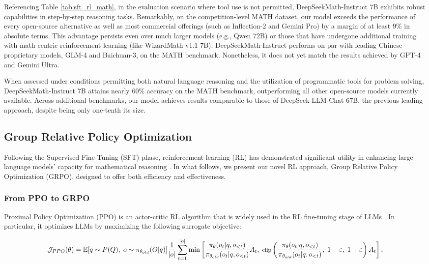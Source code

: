 \begin{itemize}[topsep=0pt]
\begin{itemize}[topsep=0pt]
Referencing Table \ref{tab:sft_rl_math}, in the evaluation scenario where tool use is not permitted, DeepSeekMath-Instruct 7B exhibits robust capabilities in step-by-step reasoning tasks. Remarkably, on the competition-level MATH dataset, our model exceeds the performance of every open-source alternative as well as most commercial offerings (such as Inflection-2 and Gemini Pro) by a margin of at least 9\% in absolute terms. This advantage persists even over much larger models (e.g., Qwen 72B) or those that have undergone additional training with math-centric reinforcement learning (like WizardMath-v1.1 7B). DeepSeekMath-Instruct performs on par with leading Chinese proprietary models, GLM-4 and Baichuan-3, on the MATH benchmark. Nonetheless, it does not yet match the results achieved by GPT-4 and Gemini Ultra.

When assessed under conditions permitting both natural language reasoning and the utilization of programmatic tools for problem solving, DeepSeekMath-Instruct 7B attains nearly 60\% accuracy on the MATH benchmark, outperforming all other open-source models currently available. Across additional benchmarks, our model achieves results comparable to those of DeepSeek-LLM-Chat 67B, the previous leading approach, despite being only one-tenth its size.

\subsection{Group Relative Policy Optimization} Following the Supervised Fine-Tuning (SFT) phase, reinforcement learning (RL) has demonstrated significant utility in enhancing large language models' capacity for mathematical reasoning \citep{wang2023math,wizardmath}. In what follows, we present our novel RL approach, Group Relative Policy Optimization (GRPO), designed to offer both efficiency and effectiveness.

\subsubsection{From PPO to GRPO} Proximal Policy Optimization (PPO) \citep{schulman2017proximal} is an actor-critic RL algorithm that is widely used in the RL fine-tuning stage of LLMs \citep{ouyang2022training}. In particular, it optimizes LLMs by maximizing the following surrogate objective:

\begin{equation}
\footnotesize
    \mathcal{J}_{PPO}(\theta) = \mathbb{E}{[q \sim P(Q),\ o \sim \pi_{\theta_{old}}(O|q)]} \frac{1}{|o|} \sum_{t=1}^{|o|} \min \left[ \frac{\pi_\theta(o_{t} | q, o_{<t})}{\pi_{\theta_{old}}(o_{t} | q, o_{<t})} A_{t},\ \text{clip} \left( \frac{\pi_\theta(o_{t} | q, o_{<t})}{\pi_{\theta_{old}}(o_{t} | q, o_{<t})},\ 1 - \varepsilon,\ 1 + \varepsilon \right) A_{t} \right],
\end{equation}


\end{itemize}
\end{itemize}
